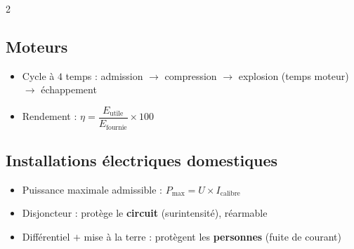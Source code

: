 \begin{multicols}{2}
\subsection*{\color{onbo}Moteurs}
\begin{itemize}
\item Cycle à $4$ temps : admission $\to$ compression $\to$ explosion (temps moteur)
$\to$ échappement
\item Rendement : $\eta=\dfrac{E_{\text{utile}}}{E_{\text{fournie}}}\times100$
\end{itemize}

\subsection*{\color{onbo}Installations électriques domestiques}
\begin{itemize}
\item Puissance maximale admissible : $P_{\max}=U\times I_{\text{calibre}}$
\item Disjoncteur : protège le \textbf{circuit} (surintensité), réarmable
\item Différentiel $+$ mise à la terre : protègent les \textbf{personnes} (fuite de
courant)
\end{itemize}

\end{multicols}
